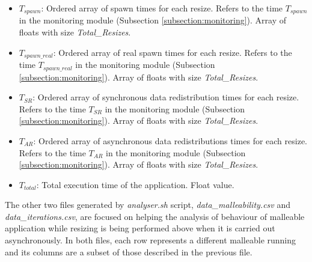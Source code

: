 \begin{itemize}
\begin{itemize}
        \item $T_{spawn}$: Ordered array of spawn times for each resize. Refers to the time $T_{spawn}$ in the monitoring module (Subsection \ref{subsection:monitoring}). Array of floats with size \textit{Total\_Resizes}. 
        \item $T_{spawn\_real}$: Ordered array of real spawn times for each resize. Refers to the time $T_{spawn\_real}$ in the monitoring module (Subsection \ref{subsection:monitoring}). Array of floats with size \textit{Total\_Resizes}.
        \item $T_{SR}$: Ordered array of synchronous data redistribution times for each resize. Refers to the time $T_{SR}$ in the monitoring module (Subsection \ref{subsection:monitoring}). Array of floats with size \textit{Total\_Resizes}. 
        \item $T_{AR}$: Ordered array of asynchronous data redistributions times for each resize. Refers to the time $T_{AR}$ in the monitoring module (Subsection \ref{subsection:monitoring}). Array of floats with size \textit{Total\_Resizes}. 
        \item $T_{total}$: Total execution time of the application. Float value.
    \end{itemize}
    
\end{itemize}
The other two files generated by \textit{analyser.sh} script, \textit{data\_malleability.csv} and \textit{data\_iterations.csv}, are focused on helping the analysis of behaviour of malleable application   while resizing is being performed above  when it is carried out asynchronously. In both files, each row represents a different malleable running and its columns are a subset of those described in the previous file.

